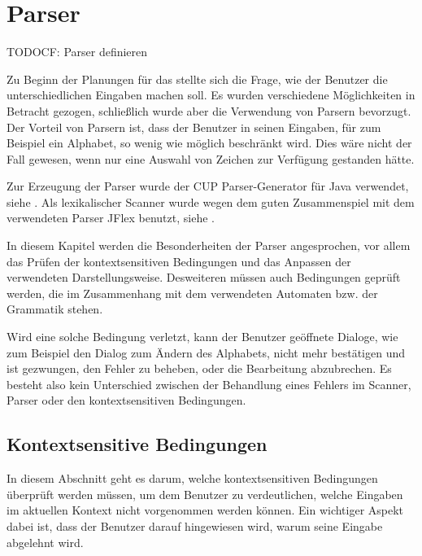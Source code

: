 



\chapter{Parser}\label{Parser}

TODOCF: Parser definieren

Zu Beginn der Planungen für das \gtitool stellte sich die Frage, wie der Benutzer
die unterschiedlichen Eingaben machen soll. Es wurden verschiedene
Möglichkeiten in Betracht gezogen, schließlich wurde aber die Verwendung von
Parsern bevorzugt. Der Vorteil von Parsern ist, dass der Benutzer in seinen
Eingaben, für zum Beispiel ein Alphabet, so wenig wie möglich beschränkt wird.
Dies wäre nicht der Fall gewesen, wenn nur eine Auswahl von Zeichen zur
Verfügung gestanden hätte.\vspace{10pt}

Zur Erzeugung der Parser wurde der CUP Parser-Generator für Java verwendet, siehe
\cite{java-cup}. Als lexikalischer Scanner wurde wegen dem guten Zusammenspiel
mit dem verwendeten Parser JFlex benutzt, siehe \cite{jflex}.\vspace{10pt}

In diesem Kapitel werden die Besonderheiten der Parser angesprochen, vor allem
das Prüfen der kontextsensitiven Bedingungen und das Anpassen der verwendeten
Darstellungsweise. Desweiteren müssen auch Bedingungen geprüft werden, die im
Zusammenhang mit dem verwendeten Automaten bzw. der Grammatik
stehen.\vspace{10pt}

Wird eine solche Bedingung verletzt, kann der Benutzer geöffnete Dialoge, wie zum
Beispiel den Dialog zum Ändern des Alphabets, nicht mehr bestätigen und ist
gezwungen, den Fehler zu beheben, oder die Bearbeitung abzubrechen. Es besteht
also kein Unterschied zwischen der Behandlung eines Fehlers im Scanner, Parser
oder den kontextsensitiven Bedingungen.\vspace{10pt}


\section{Kontextsensitive Bedingungen}\label{ParserContext}

In diesem Abschnitt geht es darum, welche kontextsensitiven Bedingungen
über\-prüft werden müssen, um dem Benutzer zu verdeutlichen, welche Eingaben im
aktuellen Kontext nicht vorgenommen werden können. Ein wichtiger Aspekt dabei
ist, dass der Benutzer darauf hingewiesen wird, warum seine Eingabe abgelehnt
wird.\vspace{10pt}

